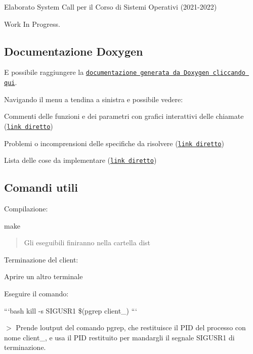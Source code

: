 Elaborato System Call per il Corso di Sistemi Operativi (2021-\/2022) 



Work In Progress.

\subsection*{Documentazione Doxygen}

E\textquotesingle{} possibile raggiungere la \href{https://zfd-progetti-univr-2021-2022.github.io/system_call/doxygen/html/index.html}{\tt documentazione generata da Doxygen cliccando qui}.

Navigando il menu\textquotesingle{} a tendina a sinistra e\textquotesingle{} possibile vedere\+:
\begin{DoxyItemize}
\item Commenti delle funzioni e dei parametri con grafici interattivi delle chiamate (\href{https://zfd-progetti-univr-2021-2022.github.io/system_call/doxygen/html/files.html}{\tt link diretto})
\item Problemi o incomprensioni delle specifiche da risolvere (\href{https://zfd-progetti-univr-2021-2022.github.io/system_call/doxygen/html/warning.html}{\tt link diretto})
\item Lista delle cose da implementare (\href{https://zfd-progetti-univr-2021-2022.github.io/system_call/doxygen/html/todo.html}{\tt link diretto})
\end{DoxyItemize}

\subsection*{Comandi utili}

Compilazione\+: 
\begin{DoxyCode}
make
\end{DoxyCode}
 \begin{quote}
Gli eseguibili finiranno nella cartella {\ttfamily dist} \end{quote}


Terminazione del client\+:
\begin{DoxyEnumerate}
\item Aprire un altro terminale
\item Eseguire il comando\+:

```bash kill -\/s S\+I\+G\+U\+S\+R1 \$(pgrep client\+\_) ```

$>$ Prende l\textquotesingle{}output del comando pgrep, che restituisce il P\+ID del processo con nome client\+\_, e usa il P\+ID restituito per mandargli il segnale S\+I\+G\+U\+S\+R1 di terminazione.
\end{DoxyEnumerate}

